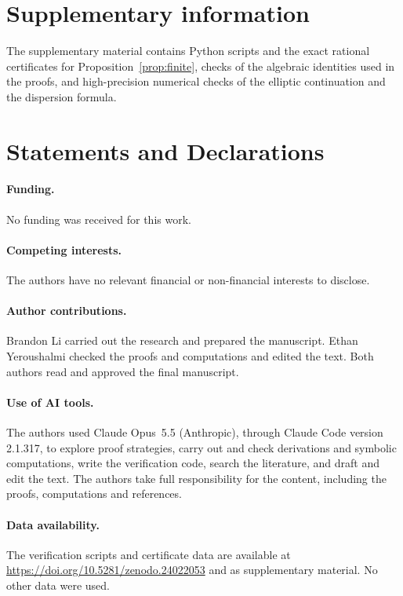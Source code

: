 \documentclass[11pt]{article}
\begin{document}
\section*{Supplementary information}
The supplementary material contains Python scripts and the exact rational
certificates for Proposition~\ref{prop:finite}, checks of the algebraic
identities used in the proofs, and high-precision numerical checks of the
elliptic continuation and the dispersion formula.

\section*{Statements and Declarations}
\paragraph{Funding.} No funding was received for this work.

\paragraph{Competing interests.} The authors have no relevant financial or
non-financial interests to disclose.

\paragraph{Author contributions.} Brandon Li carried out the research and
prepared the manuscript. Ethan Yeroushalmi checked the proofs and
computations and edited the text. Both authors read and approved the final
manuscript.

\paragraph{Use of AI tools.} The authors used Claude Opus~5.5 (Anthropic),
through Claude Code version 2.1.317, to explore proof strategies, carry out
and check derivations and symbolic computations, write the verification
code, search the literature, and draft and edit the text. The authors take
full responsibility for the content, including the proofs, computations and
references.

\paragraph{Data availability.} The verification scripts and certificate
data are available at \url{https://doi.org/10.5281/zenodo.24022053} and as
supplementary material. No other data were used.
\end{document}
